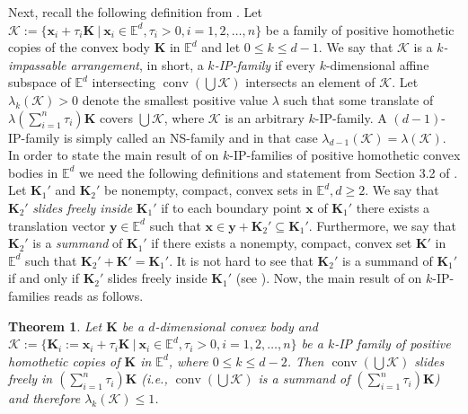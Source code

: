 \documentclass[12pt]{article}
\newtheorem{thm}{Theorem}
\DeclareMathOperator{\conv}{conv}
\newcommand{\xx}{\mathbf{x}}
\newcommand{\K}{\mathcal{K}}
\newcommand{\KK}{\mathbf K}
\newcommand{\Ee}{{\mathbb E}}
\newcommand{\y}{\mathbf{y}}
\begin{document}
Next, recall the following definition from \cite{BezLan16}. Let $\K := \{ \xx_i + \tau_i \KK \ |\  \xx_i\in \Ee^d, \tau_i>0, i=1,2,\ldots, n\}$ be a family of positive homothetic copies of the convex body $\KK$ in $\Ee^d$ and let $0\le k\le d-1$. We say that $\K$ is a {\it $k$-impassable arrangement}, in short, a {\it $k$-IP-family} if every $k$-dimensional affine subspace of $\Ee^d$ intersecting $\conv \left( \bigcup \K \right)$ intersects an element of $\K$. Let $\lambda_k(\K) > 0$ denote the smallest positive value $\lambda$ such that some translate of $\lambda \left( \sum\limits_{i=1}^n \tau_i \right) \KK$ covers $\bigcup \K$, where $\K$ is an arbitrary $k$-IP-family. A $(d-1)$-IP-family is simply called an NS-family and in that case $\lambda_{d-1}(\K)=\lambda(\K)$. In order to state the main result of  \cite{BezLan16} on $k$-IP-families of positive homothetic convex bodies in $\Ee^d$ we need the following definitions and statement from Section 3.2 of \cite{Sch14}. Let $\KK_1'$ and $\KK_2'$ be nonempty, compact, convex sets in $\Ee^d, d\ge 2$. We say that $\KK_2'$ {\it slides freely inside} $\KK_1'$ if to each boundary point $\xx$ of $\KK_1'$ there exists a translation vector $\y\in\Ee^d$ such that $\xx\in\y+\KK_2'\subseteq\KK_1'$.
Furthermore, we say that $\KK_2'$ is a {\it summand} of $\KK_1'$ if there exists a nonempty, compact, convex set $\KK'$ in $\Ee^d$ such that $\KK_2'+\KK'=\KK_1'$. It is not hard to see that $\KK_2'$ is a summand of $\KK_1'$ if and only if $\KK_2'$ slides freely inside $\KK_1'$ (see \cite[Theorem 3.2.2.]{Sch14}). Now, the main result of  \cite{BezLan16} on $k$-IP-families reads as follows. 

\begin{thm}\label{k-IP-family}
Let $\KK$ be a $d$-dimensional convex body and $\K:=\{ \KK_i := \xx_i + \tau_i \KK\ |\  \xx_i\in \Ee^d, \tau_i>0, i=1,2,\ldots, n\}$
be a $k$-IP family of positive homothetic copies of $\KK$ in $\Ee^d$, where $0 \leq k \leq d-2$. Then $\conv \left(\bigcup \K \right)$ slides freely in $\left( \sum_{i=1}^n \tau_i \right) \KK$ (i.e., $\conv \left(\bigcup \K \right)$ is a summand of $\left( \sum_{i=1}^n \tau_i \right) \KK$) and therefore $\lambda_k(\K) \leq 1$. 
\end{thm}
\end{document}
